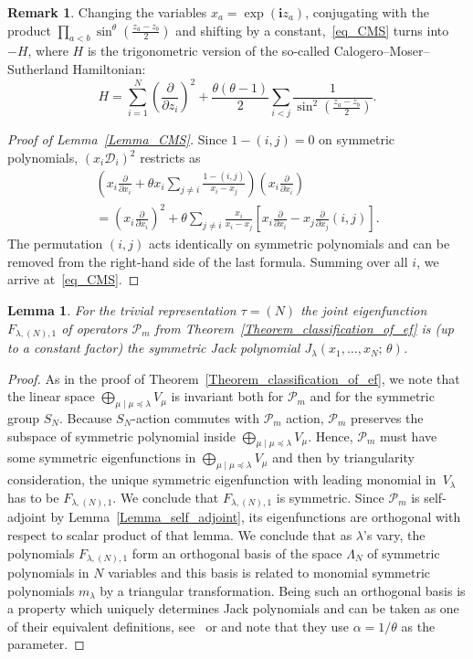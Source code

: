 \documentclass[11pt]{article}
\newtheorem{lemma}[theo]{Lemma}
\theoremstyle{definition}
\newtheorem{rema}[theo]{Remark}
\numberwithin{equation}{section}
\newcommand{\ii}{\mathbf i}
\newcommand{\D}{\mathcal D}
\newcommand{\PP}{\mathcal P}
\begin{document}
\begin{rema} Changing the variables  $x_a=\exp(\ii z_a)$, conjugating with the product $\prod_{a<b} \sin^{\theta}\left( \frac{z_a-z_b}{2}\right)$ and shifting by a constant,~\eqref{eq_CMS} turns into $-H$, where $H$ is the trigonometric version of the so-called Calogero--Moser--Sutherland Hamiltonian:
$$
 H=\sum_{i=1}^N \left(\frac{\partial}{\partial z_i}\right)^2 + \frac{\theta(\theta-1)}{2}\sum_{i<j}  \frac{1}{\sin^2 \left(\frac{z_a-z_b}{2}\right)}.
$$

\end{rema}
\begin{proof}[Proof of Lemma~\ref{Lemma_CMS}] Since $1-(i,j)=0$ on symmetric polynomials, $(x_i \D_i)^2$ restricts as
\begin{multline*}
 \left(x_i \frac{\partial}{\partial x_i} + \theta x_i \sum_{j\ne i} \frac{1-(i,j)}{x_i-x_j}\right) \left(x_i \frac{\partial}{\partial x_i}\right)\\ =
 \left(x_i \frac{\partial}{\partial x_i}\right)^2+\theta \sum_{ j\ne i} \frac{x_i}{x_i-x_j} \left[ x_i \frac{\partial}{\partial x_i} - x_j \frac{\partial}{\partial x_j} (i,j)\right].
\end{multline*}
The permutation $(i,j)$ acts identically on symmetric polynomials and can be removed from the right-hand side of the last formula. Summing over all $i$, we arrive at~\eqref{eq_CMS}.
\end{proof}
\begin{lemma} \label{Lemma_Symmetric_is_Jack}
 For the trivial representation $\tau=(N)$ the joint eigenfunction $F_{\lambda,(N),1}$ of operators $\PP_m$ from Theorem~\ref{Theorem_classification_of_ef} is (up to a constant factor) the symmetric Jack polynomial $J_\lambda(x_1,\dots,x_N;\, \theta)$.
\end{lemma}
\begin{proof}
 As in the proof of Theorem~\ref{Theorem_classification_of_ef}, we note that the linear space $\bigoplus\limits_{\mu\mid \mu\preceq \lambda} V_{\mu}$
 is invariant  both for $\PP_m$ and for the symmetric group $S_N$. Because $S_N$-action commutes with $\PP_m$ action, $\PP_m$ preserves the subspace of symmetric polynomial inside $\bigoplus\limits_{\mu\mid \mu\preceq \lambda} V_{\mu}$. Hence, $\PP_m$ must have some symmetric eigenfunctions in  $\bigoplus\limits_{\mu\mid \mu\preceq \lambda} V_{\mu}$ and then by triangularity consideration, the unique symmetric eigenfunction with leading monomial in~$V_\lambda$ has to be $F_{\lambda,(N),1}$. We conclude that $F_{\lambda,(N),1}$ is symmetric. Since $\PP_m$ is self-adjoint by Lemma~\ref{Lemma_self_adjoint}, its eigenfunctions are orthogonal with respect to scalar product of that lemma. We conclude that as $\lambda$'s vary, the polynomials $F_{\lambda,(N),1}$ form an orthogonal basis of the space $\Lambda_N$ of symmetric polynomials in $N$ variables and this basis is related to monomial symmetric polynomials $m_\lambda$ by a triangular transformation. Being such an orthogonal basis is a property which uniquely determines Jack polynomials and can be taken as one of their equivalent definitions, see~\cite{stanley1989some} or \cite[Section 6.10]{macdonald1998symmetric} and note that they use $\alpha=1/\theta$ as the parameter.
\end{proof}
\end{document}
